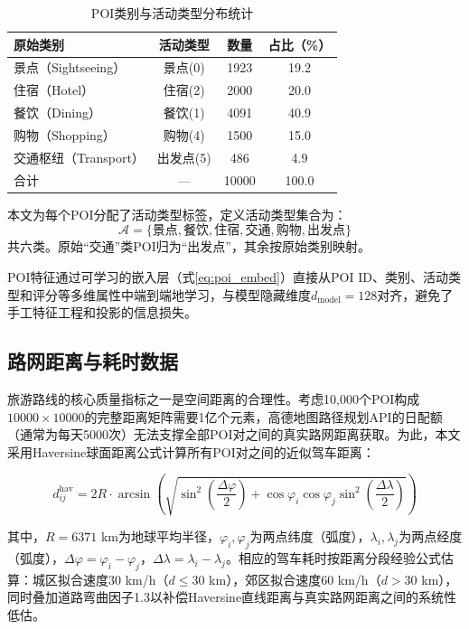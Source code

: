 \documentclass[12pt,a4paper]{ctexart}
\newenvironment{tighttable}
  {\setstretch{1.0}\small}
  {}
\begin{document}
\begin{table}[H]
\centering
\caption{POI类别与活动类型分布统计}
\label{tab:poi_dist}
\begin{tighttable}
\begin{tabular}{lccc}
\toprule
原始类别 & 活动类型 & 数量 & 占比（\%） \\
\midrule
景点（Sightseeing） & 景点(0) & 1923 & 19.2 \\
住宿（Hotel） & 住宿(2) & 2000 & 20.0 \\
餐饮（Dining） & 餐饮(1) & 4091 & 40.9 \\
购物（Shopping） & 购物(4) & 1500 & 15.0 \\
交通枢纽（Transport） & 出发点(5) & 486 & 4.9 \\
\midrule
合计 & — & 10000 & 100.0 \\
\bottomrule
\end{tabular}
\end{tighttable}
\end{table}

本文为每个POI分配了活动类型标签，定义活动类型集合为：
\begin{equation}
\mathcal{A}=\{\text{景点},\text{餐饮},\text{住宿},\text{交通},\text{购物},\text{出发点}\}
\end{equation}
共六类。原始“交通”类POI归为“出发点”，其余按原始类别映射。

POI特征通过可学习的嵌入层（式\ref{eq:poi_embed}）直接从POI ID、类别、活动类型和评分等多维属性中端到端地学习，与模型隐藏维度$d_{\text{model}}=128$对齐，避免了手工特征工程和投影的信息损失。

\subsection{路网距离与耗时数据}

旅游路线的核心质量指标之一是空间距离的合理性。考虑10,000个POI构成$10000\times 10000$的完整距离矩阵需要1亿个元素，高德地图路径规划API的日配额（通常为每天5000次）无法支撑全部POI对之间的真实路网距离获取。为此，本文采用Haversine球面距离公式计算所有POI对之间的近似驾车距离：

\begin{equation}
d_{ij}^{\text{hav}}=2R\cdot\arcsin\!\left(\sqrt{\sin^2\!\left(\frac{\Delta\varphi}{2}\right)+\cos\varphi_i\cos\varphi_j\sin^2\!\left(\frac{\Delta\lambda}{2}\right)}\right)
\label{eq:haversine}
\end{equation}

其中，$R=6371$ km为地球平均半径，$\varphi_i,\varphi_j$为两点纬度（弧度），$\lambda_i,\lambda_j$为两点经度（弧度），$\Delta\varphi=\varphi_i-\varphi_j$，$\Delta\lambda=\lambda_i-\lambda_j$。相应的驾车耗时按距离分段经验公式估算：城区拟合速度30 km/h（$d\leq 30$ km），郊区拟合速度60 km/h（$d>30$ km），同时叠加道路弯曲因子1.3以补偿Haversine直线距离与真实路网距离之间的系统性低估。
\end{document}
